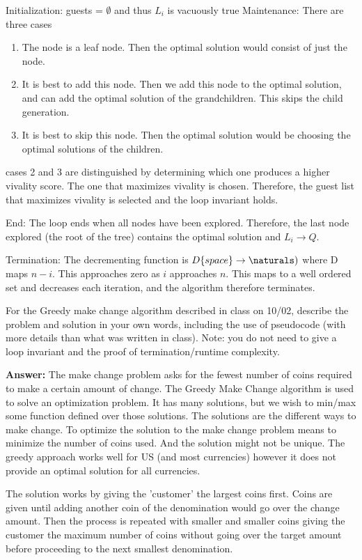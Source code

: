 \documentclass{article}
\begin{document}
Initialization: guests = $\emptyset$ and thus $L_i$ is vacuously true
Maintenance: There are three cases
\begin{enumerate}[1.]
\item The node is a leaf node. Then the optimal solution would consist of just the node.
\item It is best to add this node. Then we add this node to the optimal solution,
and can add the optimal solution of the grandchildren. This skips the child generation.
\item It is best to skip this node. Then the optimal solution would be choosing the optimal solutions of the children.
\end{enumerate}
cases 2 and 3 are distinguished by determining which one produces a higher vivality score.
The one that maximizes vivality is chosen. Therefore, the guest list that maximizes vivality is selected and the loop invariant holds.

End: The loop ends when all nodes have been explored. Therefore, the last node explored (the root of the tree) contains the optimal solution and $L_i \rightarrow Q$.

Termination: The decrementing function is $D\{space\} \rightarrow \naturals)$ where D maps $n - i$.
This approaches zero as $i$ approaches $n$. This maps to a well ordered set and decreases each iteration,
and the algorithm therefore terminates.


\nextprob
For the Greedy make change algorithm described in class on 10/02, describe the
problem and solution in your own words, including the use of pseudocode (with
more details than what was written in class).  Note: you do not need to give a
loop invariant and the proof of termination/runtime complexity.

\textbf{Answer:} The make change problem asks for the fewest number of coins required to make a certain amount of change.
The Greedy Make Change algorithm is used to solve an optimization problem. It has many solutions,
but we wish to min/max some function defined over those solutions. The solutions are the different ways to make change.
To optimize the solution to the make change problem means to minimize the number of coins used.
And the solution might not be unique. The greedy approach works well for US (and most currencies) however it does not provide an optimal solution for all currencies.

The solution works by giving the 'customer' the largest coins first. Coins are given until adding another coin of the denomination would go over the change amount.
Then the process is repeated with smaller and smaller coins giving the customer the maximum number of coins without going over the target amount before proceeding to the next smallest denomination.
\end{document}
